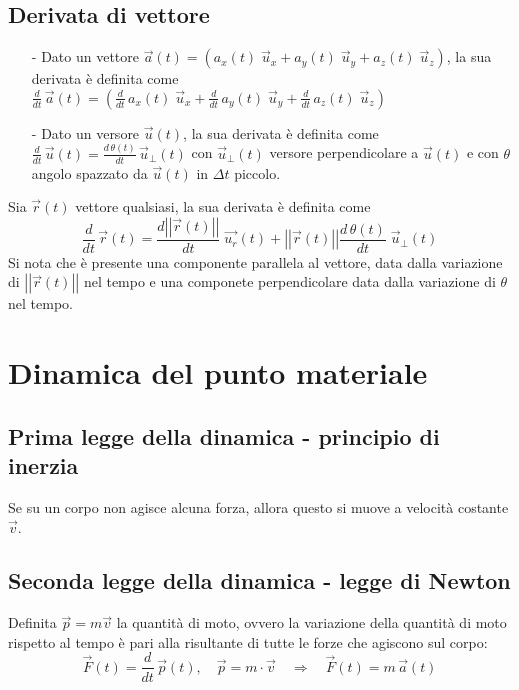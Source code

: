 \documentclass[a4paper]{article}
\newcommand\ux{\vec{u}_x}
\newcommand\uy{\vec{u}_y}
\newcommand\uz{\vec{u}_z}
\newcommand\uper{\vec{u}_\perp}
\newcommand\dt{\frac{d}{dt}\,}
\newcommand\vmod[1]{\left|\left|{#1}\right|\right|}
\begin{document}
\subsection{Derivata di vettore}
\begin{itemize}
	\item[-] Dato un vettore \(\vec{a}(t) = (a_x(t) \; \ux + a_y(t) \; \uy + a_z(t) \; \uz)\), la sua derivata è definita come \\
	\(\displaystyle \dt \vec{a}(t) = \left(\dt a_x(t) \; \ux + \dt a_y(t) \; \uy + \dt a_z(t) \; \uz\right)\)
	\item[-] Dato un versore \(\vec{u}(t)\), la sua derivata è definita come \(\displaystyle \dt \vec{u}(t) = \frac{d \, \theta(t)}{dt} \, \uper(t)\)
	con \(\uper(t)\) versore perpendicolare a \(\vec{u}(t)\) e con \(\theta\) angolo spazzato da \(\vec{u}(t)\) in \(\Delta t\) piccolo.
\end{itemize}
Sia \(\vec{r}(t)\) vettore qualsiasi, la sua derivata è definita come
\[\dt \vec{r}(t) = \frac{d \vmod{\vec{r}(t)}}{dt} \; \vec{u_r}(t) + \vmod{\vec{r}(t)} \frac{d \, \theta(t)}{dt} \; \uper(t)\]
Si nota che è presente una componente parallela al vettore, data dalla variazione di \(\vmod{\vec{r}(t)}\) nel tempo e una
componete perpendicolare data dalla variazione di \(\theta\) nel tempo.

\newpage


\section{Dinamica del punto materiale}
\subsection{Prima legge della dinamica - principio di inerzia}
Se su un corpo non agisce alcuna forza, allora questo si muove a velocità costante \(\vec{v}\).

\subsection{Seconda legge della dinamica - legge di Newton}
Definita \(\vec{p} = m \vec{v}\) la quantità di moto, ovvero la variazione della quantità di moto rispetto al tempo è pari alla
risultante di tutte le forze che agiscono sul corpo:
\[\vec{F}(t) = \dt \vec{p}(t), \quad \vec{p} = m \cdot \vec{v} \quad \Rightarrow \quad \vec{F}(t) = m \, \vec{a}(t)\]
\end{document}
